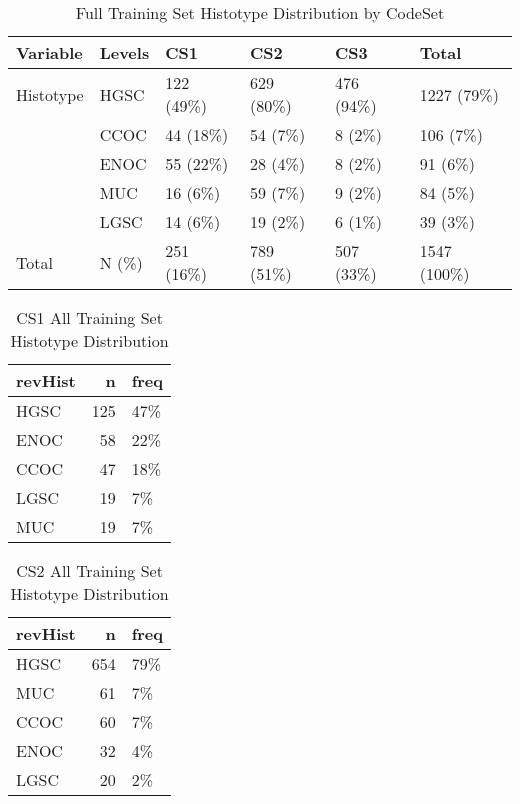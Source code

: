 \documentclass[
]{report}
\begin{document}
\begin{table}

\caption{\label{tab:train-hist-codeset}Full Training Set Histotype Distribution by CodeSet}
\centering
\begin{tabular}[t]{l|l|l|l|l|l}
\hline
Variable & Levels & CS1 & CS2 & CS3 & Total\\
\hline
Histotype & HGSC & 122 (49\%) & 629 (80\%) & 476 (94\%) & 1227 (79\%)\\
\hline
 & CCOC & 44 (18\%) & 54 (7\%) & 8 (2\%) & 106 (7\%)\\
\hline
 & ENOC & 55 (22\%) & 28 (4\%) & 8 (2\%) & 91 (6\%)\\
\hline
 & MUC & 16 (6\%) & 59 (7\%) & 9 (2\%) & 84 (5\%)\\
\hline
 & LGSC & 14 (6\%) & 19 (2\%) & 6 (1\%) & 39 (3\%)\\
\hline
Total & N (\%) & 251 (16\%) & 789 (51\%) & 507 (33\%) & 1547 (100\%)\\
\hline
\end{tabular}
\end{table}

\begin{table}

\caption{\label{tab:cs1-all-hist}CS1 All Training Set Histotype Distribution}
\centering
\begin{tabular}[t]{l|r|l}
\hline
revHist & n & freq\\
\hline
HGSC & 125 & 47\%\\
\hline
ENOC & 58 & 22\%\\
\hline
CCOC & 47 & 18\%\\
\hline
LGSC & 19 & 7\%\\
\hline
MUC & 19 & 7\%\\
\hline
\end{tabular}
\end{table}

\begin{table}

\caption{\label{tab:cs2-all-hist}CS2 All Training Set Histotype Distribution}
\centering
\begin{tabular}[t]{l|r|l}
\hline
revHist & n & freq\\
\hline
HGSC & 654 & 79\%\\
\hline
MUC & 61 & 7\%\\
\hline
CCOC & 60 & 7\%\\
\hline
ENOC & 32 & 4\%\\
\hline
LGSC & 20 & 2\%\\
\hline
\end{tabular}
\end{table}
\end{document}
